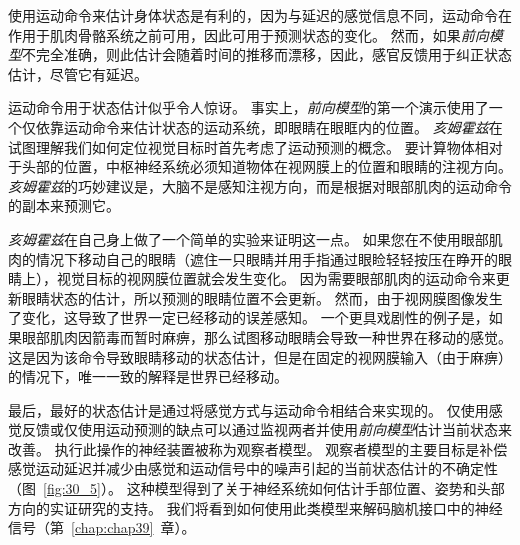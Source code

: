 使用运动命令来估计身体状态是有利的，因为与延迟的感觉信息不同，运动命令在作用于肌肉骨骼系统之前可用，因此可用于预测状态的变化。
然而，如果\textit{前向模型}不完全准确，则此估计会随着时间的推移而漂移，因此，感官反馈用于纠正状态估计，尽管它有延迟。


运动命令用于状态估计似乎令人惊讶。
事实上，\textit{前向模型}的第一个演示使用了一个仅依靠运动命令来估计状态的运动系统，即眼睛在眼眶内的位置。
\textit{亥姆霍兹}在试图理解我们如何定位视觉目标时首先考虑了运动预测的概念。
要计算物体相对于头部的位置，中枢神经系统必须知道物体在视网膜上的位置和眼睛的注视方向。
\textit{亥姆霍兹}的巧妙建议是，大脑不是感知注视方向，而是根据对眼部肌肉的运动命令的副本来预测它。


\textit{亥姆霍兹}在自己身上做了一个简单的实验来证明这一点。
如果您在不使用眼部肌肉的情况下移动自己的眼睛（遮住一只眼睛并用手指通过眼睑轻轻按压在睁开的眼睛上），视觉目标的视网膜位置就会发生变化。
因为需要眼部肌肉的运动命令来更新眼睛状态的估计，所以预测的眼睛位置不会更新。
然而，由于视网膜图像发生了变化，这导致了世界一定已经移动的误差感知。
一个更具戏剧性的例子是，如果眼部肌肉因箭毒而暂时麻痹，那么试图移动眼睛会导致一种世界在移动的感觉。
这是因为该命令导致眼睛移动的状态估计，但是在固定的视网膜输入（由于麻痹）的情况下，唯一一致的解释是世界已经移动。


最后，最好的状态估计是通过将感觉方式与运动命令相结合来实现的。
仅使用感觉反馈或仅使用运动预测的缺点可以通过监视两者并使用\textit{前向模型}估计当前状态来改善。
执行此操作的神经装置被称为观察者模型。
观察者模型的主要目标是补偿感觉运动延迟并减少由感觉和运动信号中的噪声引起的当前状态估计的不确定性（图~\ref{fig:30_5}）。
这种模型得到了关于神经系统如何估计手部位置、姿势和头部方向的实证研究的支持。
我们将看到如何使用此类模型来解码脑机接口中的神经信号（第~\ref{chap:chap39}~章）。


